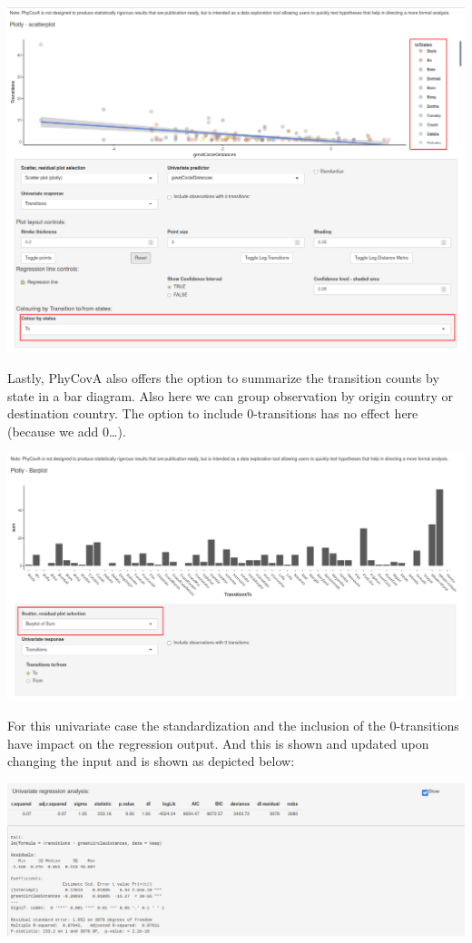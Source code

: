 \documentclass[
]{article}
\begin{document}
\includegraphics{tutorial_img/colourFrom.png}

Lastly, PhyCovA also offers the option to summarize the transition
counts by state in a bar diagram. Also here we can group observation by
origin country or destination country. The option to include
0-transitions has no effect here (because we add 0\ldots).

\includegraphics{tutorial_img/UNi_Bar.png}

For this univariate case the standardization and the inclusion of the
0-transitions have impact on the regression output. And this is shown
and updated upon changing the input and is shown as depicted below:

\includegraphics{tutorial_img/Univariate_Regression.png}
\end{document}
